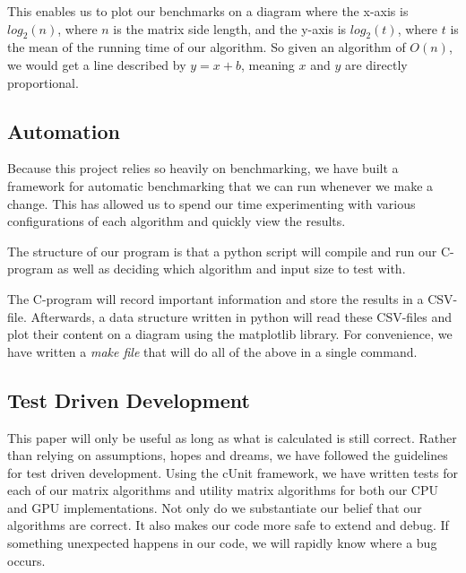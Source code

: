 This enables us to plot our benchmarks on a diagram where the x-axis is $log_2(n)$, where $n$ is the matrix side length, and the y-axis is $log_2(t)$, where $t$ is the mean of the running time of our algorithm. So given an algorithm of $O(n)$, we would get a line described by $y = x + b$, meaning $x$ and $y$ are directly proportional. 

\subsection{Automation}
Because this project relies so heavily on benchmarking, we have built a framework for automatic benchmarking that we can run whenever we make a change. This has allowed us to spend our time experimenting with various configurations of each algorithm and quickly view the results. 

The structure of our program is that a python script will compile and run our C-program as well as deciding which algorithm and input size to test with. 

The C-program will record important information and store the results in a CSV-file. Afterwards, a data structure written in python will read these CSV-files and plot their content on a diagram using the matplotlib library. For convenience, we have written a \textit{make file} that will do all of the above in a single command. 

\subsection{Test Driven Development}
This paper will only be useful as long as what is calculated is still correct. Rather than relying on assumptions, hopes and dreams, we have followed the guidelines for test driven development. Using the cUnit framework, we have  written tests for each of our matrix algorithms and utility matrix algorithms for both our CPU and GPU implementations. 
Not only do we substantiate our belief that our algorithms are correct. It also makes our code more safe to extend and debug. If something unexpected happens in our code, we will rapidly know where a bug occurs.